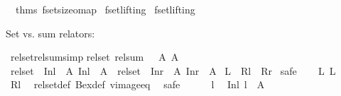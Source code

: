 \begin{isabellebody}
\ \ {\isacharat}{\isacharbraceleft}thms\ fset{\isacharunderscore}size{\isacharunderscore}o{\isacharunderscore}map{\isacharbraceright}\isanewline
{\isacartoucheclose}%
\endisatagML
{\isafoldML}%
%
\isadelimML
%
\endisadelimML
\isanewline
\isanewline
{}\isamarkupfalse%
\ fset{\isachardot}lifting\isanewline
{}\isamarkupfalse%
\ fset{\isachardot}lifting%
\isadelimdocument
%
\endisadelimdocument
%
\isatagdocument
%
\isamarkuptrue%
%
\endisatagdocument
{\isafolddocument}%
%
\isadelimdocument
%
\endisadelimdocument
%
\begin{isamarkuptext}%
Set vs. sum relators:%
\end{isamarkuptext}\isamarkuptrue%
\isamarkupfalse%
\ rel{\isacharunderscore}set{\isacharunderscore}rel{\isacharunderscore}sum{\isacharbrackleft}simp{\isacharbrackright}{\isacharcolon}\isanewline
{\isachardoublequoteopen}rel{\isacharunderscore}set\ {\isacharparenleft}rel{\isacharunderscore}sum\ {\isasymchi}\ {\isasymphi}{\isacharparenright}\ A{}\ A{}\ {\isasymlongleftrightarrow}\isanewline
\ rel{\isacharunderscore}set\ {\isasymchi}\ {\isacharparenleft}Inl\ {\isacharminus}{\isacharbackquote}\ A{}{\isacharparenright}\ {\isacharparenleft}Inl\ {\isacharminus}{\isacharbackquote}\ A{}{\isacharparenright}\ {\isasymand}\ rel{\isacharunderscore}set\ {\isasymphi}\ {\isacharparenleft}Inr\ {\isacharminus}{\isacharbackquote}\ A{}{\isacharparenright}\ {\isacharparenleft}Inr\ {\isacharminus}{\isacharbackquote}\ A{}{\isacharparenright}{\isachardoublequoteclose}\isanewline
{\isacharparenleft}\ {\isachardoublequoteopen}{\isacharquery}L\ {\isasymlongleftrightarrow}\ {\isacharquery}Rl\ {\isasymand}\ {\isacharquery}Rr{\isachardoublequoteclose}{\isacharparenright}\isanewline
%
\isadelimproof
%
\endisadelimproof
%
\isatagproof
{}\isamarkupfalse%
\ safe\isanewline
\ \ \isamarkupfalse%
\ L{\isacharcolon}\ {\isachardoublequoteopen}{\isacharquery}L{\isachardoublequoteclose}\isanewline
\ \ \isamarkupfalse%
\ {\isacharquery}Rl\ \isamarkupfalse%
\ rel{\isacharunderscore}set{\isacharunderscore}def\ Bex{\isacharunderscore}def\ vimage{\isacharunderscore}eq\ \isamarkupfalse%
\ safe\isanewline
\ \ \ \ \isamarkupfalse%
\ l{}\ \isamarkupfalse%
\ {\isachardoublequoteopen}Inl\ l{}\ {\isasymin}\ A{}{\isachardoublequoteclose}\isanewline

\end{isabellebody}
